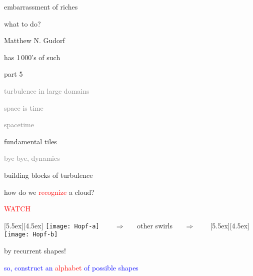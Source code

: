 \begin{frame}{embarrassment of riches}
\begin{center}
{\huge what to do?}
\end{center}

\vfill

{\Large Matthew N. Gudorf}

\medskip

\hfill has 1\,000's of such \twots
\end{frame}


\begin{frame}{part 5}
\begin{enumerate}
              \item
    \textcolor{gray}{\small
turbulence in large domains
              \item
space is time
              \item
spacetime
    }
              \item {\Large
fundamental tiles
    }\textcolor{gray}{\small
              \item
bye bye, dynamics
                    }
            \end{enumerate}
\end{frame}


\begin{frame}{building blocks of turbulence}

how do we \textcolor{red}{recognize} a cloud?

\bigskip
\begin{center}
\centerline{\textcolor{red}{\Huge WATCH}}

\begin{minipage}[t]{\textwidth}
	\begin{center}
\centerline{
\raisebox{-4.0ex}[5.5ex][4.5ex]
		 {\texttt{[image: Hopf-a]}}
~~~ $\Longrightarrow$ ~~ {other swirls} ~~ $\Longrightarrow$ ~~~
	\raisebox{-4.0ex}[5.5ex][4.5ex]
		 {\texttt{[image: Hopf-b]}}
          }
	\end{center}
\end{minipage}
\end{center}

\bigskip

{\Large by recurrent shapes!}

\vfill

\centerline{
\textcolor{blue}{so, construct an \textcolor{red}{\Large alphabet} of possible shapes}
}
\end{frame}

